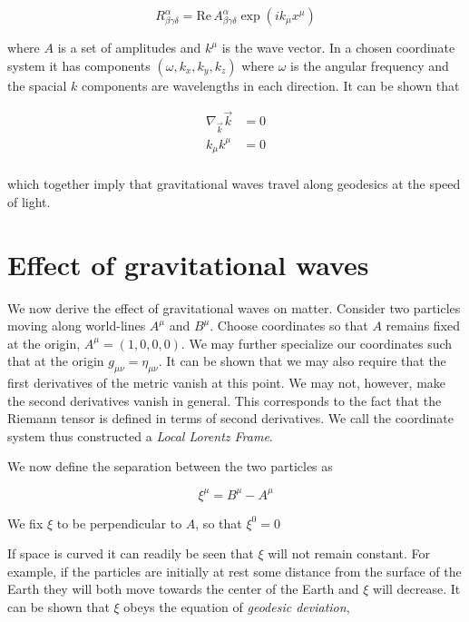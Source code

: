 \begin{equation}
R^\alpha_{\beta\gamma\delta} = 
\textrm{Re}\, A^\alpha_{\beta\gamma\delta} \exp(i k_\mu x^\mu)
\end{equation}

where $A$ is a set of amplitudes and $k^\mu$ is the wave vector.  In a
chosen coordinate system it has components $(\omega, k_x, k_y, k_z)$
where $\omega$ is the angular frequency and the spacial $k$ components
are wavelengths in each direction.  It can be shown that 

\begin{align*}
\nabla_{\vec k} \vec{k} &= 0 \\
k_\mu k^\mu &= 0 \\
\end{align*}

which together imply that gravitational waves travel along geodesics 
at the speed of light.


\section{Effect of gravitational waves}
\label{sec:effects_of_waves}

We now derive the effect of gravitational waves on matter.  Consider
two particles moving along world-lines $A^\mu$ and $B^\mu$.  Choose
coordinates so that $A$ remains fixed at the origin, $A^\mu =
(1,0,0,0)$.  We may further specialize our coordinates such that at
the origin $g_{\mu\nu} = \eta_{\mu\nu}$.  It can be shown that we may
also require that the first derivatives of the metric vanish at this
point.  We may not, however, make the second derivatives vanish in
general.  This corresponds to the fact that the Riemann tensor is
defined in terms of second derivatives.  We call the coordinate system
thus constructed a \emph{Local Lorentz Frame}.

We now define the separation between the two particles as 

\begin{equation*}
\xi^\mu = B^\mu - A^\mu
\end{equation*}

We fix $\xi$ to be perpendicular to $A$, so that $\xi^0 = 0$

If space is curved it can readily be seen that $\xi$ will not remain
constant.  For example, if the particles are initially at rest some
distance from the surface of the Earth they will both move towards 
the center of the Earth and $\xi$ will decrease.  It can be shown that 
$\xi$ obeys the equation of \emph{geodesic deviation},

